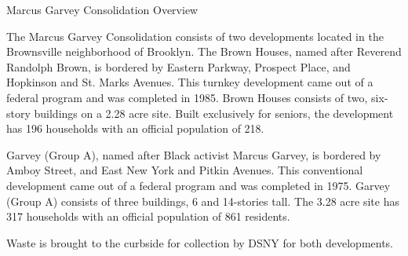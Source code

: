 Marcus Garvey Consolidation Overview

The Marcus Garvey Consolidation consists of two developments located in the Brownsville neighborhood of Brooklyn. The Brown Houses, named after Reverend Randolph Brown, is bordered by Eastern Parkway, Prospect Place, and Hopkinson and St. Marks Avenues. This turnkey development came out of a federal program and was completed in 1985. Brown Houses consists of two, six-story buildings on a 2.28 acre site. Built exclusively for seniors, the development has 196 households with an official population of 218. 

Garvey (Group A), named after Black activist Marcus Garvey, is bordered by Amboy Street, and East New York and Pitkin Avenues. This conventional development came out of a federal program and was completed in 1975. Garvey (Group A) consists of three buildings, 6 and 14-stories tall. The 3.28 acre site has 317 households with an official population of 861 residents.  

Waste is brought to the curbside for collection by DSNY for both developments.